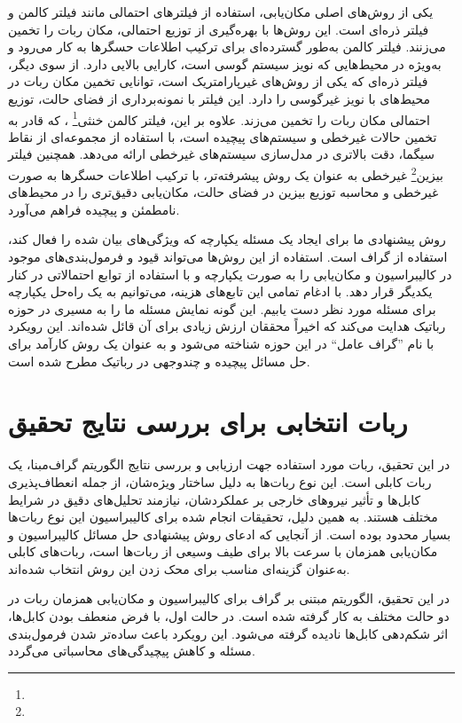 یکی از روش‌های اصلی مکان‌یابی، استفاده از فیلترهای احتمالی مانند فیلتر کالمن و فیلتر ذره‌ای است. این روش‌ها با بهره‌گیری از توزیع احتمالی، مکان ربات را تخمین می‌زنند. فیلتر کالمن به‌طور گسترده‌ای برای ترکیب اطلاعات حسگرها به کار می‌رود و به‌ویژه در محیط‌هایی که نویز سیستم گوسی است، کارایی بالایی دارد. از سوی دیگر، فیلتر ذره‌ای که یکی از روش‌های غیرپارامتریک است، توانایی تخمین مکان ربات در محیط‌های با نویز غیرگوسی را دارد. این فیلتر با نمونه‌برداری از فضای حالت، توزیع احتمالی مکان ربات را تخمین می‌زند. علاوه بر این، فیلتر کالمن خنثی\footnote{}
، که قادر به تخمین حالات غیرخطی و سیستم‌های پیچیده است، با استفاده از مجموعه‌ای از نقاط سیگما، دقت بالاتری در مدل‌سازی سیستم‌های غیرخطی ارائه می‌دهد. همچنین فیلتر بیزین\footnote{}
 غیرخطی به عنوان یک روش پیشرفته‌تر، با ترکیب اطلاعات حسگرها به صورت غیرخطی و محاسبه توزیع بیزین در فضای حالت، مکان‌یابی دقیق‌تری را در محیط‌های نامطمئن و پیچیده فراهم می‌آورد.

روش پیشنهادی ما برای ایجاد یک مسئله یکپارچه که ویژگی‌های بیان شده را فعال کند، استفاده از گراف است. استفاده از این روش‌ها می‌تواند قیود و فرمول‌بندی‌های موجود در کالیبراسیون و مکان‌یابی را به صورت یکپارچه و با استفاده از توابع احتمالاتی در کنار یکدیگر قرار دهد. با ادغام تمامی این تابع‌های هزینه، می‌توانیم به یک راه‌حل یکپارچه برای مسئله مورد نظر دست یابیم. این گونه نمایش‌ مسئله ما را به مسیری در حوزه رباتیک هدایت می‌کند که اخیراً محققان ارزش زیادی برای آن قائل شده‌اند. این رویکرد با نام ”گراف عامل“ در این حوزه شناخته می‌شود و به عنوان یک روش کارآمد برای حل مسائل پیچیده و چندوجهی در رباتیک مطرح شده است. 

\section{ربات انتخابی برای بررسی نتایج تحقیق}

در این تحقیق، ربات مورد استفاده جهت ارزیابی و بررسی نتایج الگوریتم گراف‌مبنا، یک ربات کابلی است. این نوع ربات‌ها به دلیل ساختار ویژه‌شان، از جمله انعطاف‌پذیری کابل‌ها و تأثیر نیروهای خارجی بر عملکردشان، نیازمند تحلیل‌های دقیق در شرایط مختلف هستند. به همین دلیل، تحقیقات انجام شده برای کالیبراسیون این نوع ربات‌ها بسیار محدود بوده است. از آنجایی که ادعای روش پیشنهادی حل مسائل کالیبراسیون و مکان‌یابی همزمان با سرعت بالا برای طیف وسیعی از ربات‌ها است، ربات‌های کابلی به‌عنوان گزینه‌ای مناسب برای محک زدن این روش انتخاب شده‌اند.

در این تحقیق، الگوریتم مبتنی بر گراف برای کالیبراسیون و مکان‌یابی همزمان ربات در دو حالت مختلف به کار گرفته شده است. در حالت اول، با فرض منعطف بودن کابل‌ها، اثر شکم‌دهی کابل‌ها نادیده گرفته می‌شود. این رویکرد باعث ساده‌تر شدن فرمول‌بندی مسئله و کاهش پیچیدگی‌های محاسباتی می‌گردد.

